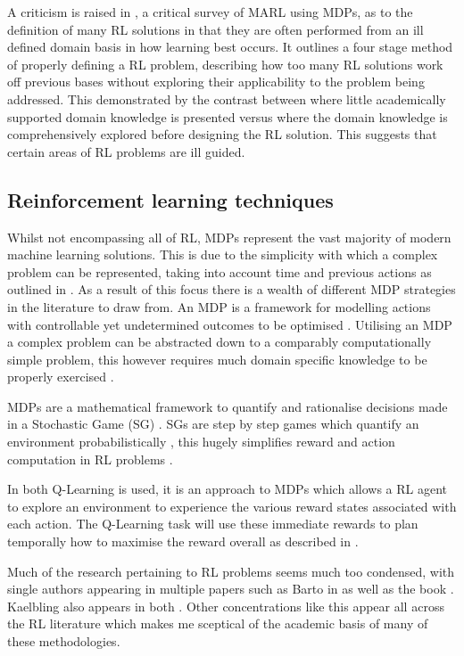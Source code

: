 \documentclass[10pt,journal]{IEEEtran}
\begin{document}
A criticism is raised in \cite{Shoham}, a critical survey of MARL using MDPs, as to the definition of many RL solutions in that they are often performed from an ill defined domain basis in how learning best occurs. It outlines a four stage method of properly defining a RL problem, describing how too many RL solutions work off previous bases without exploring their applicability to the problem being addressed. 
This demonstrated by the contrast between \cite{Amato} where little academically supported domain knowledge is presented versus \cite{Ng} where the domain knowledge is comprehensively explored before designing the RL solution. This suggests that certain areas of RL problems are ill guided.

\subsection{Reinforcement learning techniques}
Whilst not encompassing all of RL, MDPs represent the vast majority of modern machine learning solutions. This is due to the simplicity with which a complex problem can be represented, taking into account time and previous actions as outlined in \cite{Barto}. As a result of this focus there is a wealth of different MDP strategies in the literature to draw from. An MDP is a framework for modelling actions with controllable yet undetermined outcomes to be optimised \cite{Bellman}. Utilising an MDP a complex problem can be abstracted down to a comparably computationally simple problem, this however requires much domain specific knowledge to be properly exercised \cite{Shoham}.

MDPs are a mathematical framework to quantify and rationalise decisions made in a Stochastic Game (SG) \cite{Bellman}. SGs are step by step games which quantify an environment probabilistically \cite{Shapley}, this hugely simplifies reward and action computation in RL problems \cite{Busoniu}.

In both \cite{Bellemare, Amato} Q-Learning is used, it is an approach to MDPs which allows a RL agent to explore an environment to experience the various reward states associated with each action. The Q-Learning task will use these immediate rewards to plan temporally how to maximise the reward overall as described in \cite{Watkins}. 

Much of the research pertaining to RL problems seems much too condensed, with single authors appearing in multiple papers such as Barto in \cite{Barto} as well as the book \cite{Sutton}. Kaelbling also appears in both \cite{Kaelbling, Smart}. Other concentrations like this appear all across the RL literature which makes me sceptical of the academic basis of many of these methodologies. 
\end{document}
